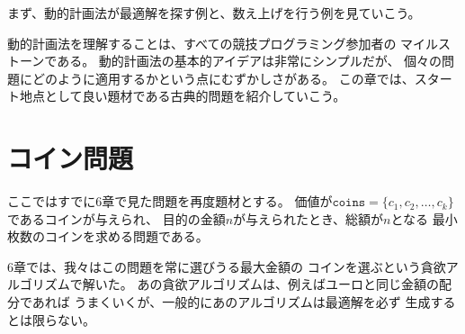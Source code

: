 まず、動的計画法が最適解を探す例と、数え上げを行う例を見ていこう。

動的計画法を理解することは、すべての競技プログラミング参加者の
マイルストーンである。
動的計画法の基本的アイデアは非常にシンプルだが、
個々の問題にどのように適用するかという点にむずかしさがある。
この章では、スタート地点として良い題材である古典的問題を紹介していこう。

\begin{comment}
\section{Coin problem}

We first focus on a problem that we
have already seen in Chapter 6:
Given a set of coin values $\texttt{coins} = \{c_1,c_2,\ldots,c_k\}$
and a target sum of money $n$, our task is to
form the sum $n$ using as few coins as possible.

In Chapter 6, we solved the problem using a
greedy algorithm that always chooses the largest
possible coin.
The greedy algorithm works, for example,
when the coins are the euro coins,
but in the general case the greedy algorithm
does not necessarily produce an optimal solution.
\end{comment}

\section{コイン問題}

ここではすでに6章で見た問題を再度題材とする。
価値が$\texttt{coins} = \{c_1,c_2,\ldots,c_k\}$であるコインが与えられ、
目的の金額$n$が与えられたとき、総額が$n$となる
最小枚数のコインを求める問題である。

6章では、我々はこの問題を常に選びうる最大金額の
コインを選ぶという貪欲アルゴリズムで解いた。
あの貪欲アルゴリズムは、例えばユーロと同じ金額の配分であれば
うまくいくが、一般的にあのアルゴリズムは最適解を必ず
生成するとは限らない。

\begin{comment}
Now is time to solve the problem efficiently
using dynamic programming, so that the algorithm
works for any coin set.
The dynamic programming
algorithm is based on a recursive function
that goes through all possibilities how to
form the sum, like a brute force algorithm.
However, the dynamic programming
algorithm is efficient because
it uses \emph{memoization} and
calculates the answer to each subproblem only once.
\end{comment}

